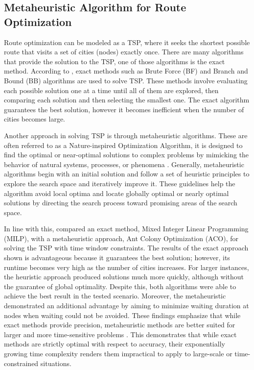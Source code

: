 \subsection{Metaheuristic Algorithm for Route Optimization}

Route optimization can be modeled as a TSP, where it seeks the shortest possible route that visits a set of cities (nodes) exactly once. There are many algorithms that provide the solution to the TSP, one of those algorithms is the exact method. According to \textcite{Violina2021}, exact methods such as Brute Force (BF) and Branch and Bound (BB) algorithms are used to solve TSP. These methods involve evaluating each possible solution one at a time until all of them are explored, then comparing each solution and then selecting the smallest one. The exact algorithm guarantees the best solution, however it becomes inefficient when the number of cities becomes large.

Another approach in solving TSP is through metaheuristic algorithms. These are often referred to as a Nature-inspired Optimization Algorithm, it is designed to find the optimal or near-optimal solutions to complex problems by mimicking the behavior of natural systems, processes, or phenomena \parencite{Sabery2023}. Generally, metaheuristic algorithms begin with an initial solution and follow a set of heuristic principles to explore the search space and iteratively improve it. These guidelines help the algorithm avoid local optima and locate globally optimal or nearly optimal solutions by directing the search process toward promising areas of the search space.

In line with this, \textcite{BarbCiorbea2023} compared an exact method, Mixed Integer Linear Programming (MILP), with a metaheuristic approach, Ant Colony Optimization (ACO), for solving the TSP with time window constraints. The results of the exact approach shown is advantageous because it guarantees the best solution; however, its runtime becomes very high as the number of cities increases. For larger instances, the heuristic approach produced solutions much more quickly, although without the guarantee of global optimality. Despite this, both algorithms were able to achieve the best result in the tested scenario. Moreover, the metaheuristic demonstrated an additional advantage by aiming to minimize waiting duration at nodes when waiting could not be avoided. These findings emphasize that while exact methods provide precision, metaheuristic methods are better suited for larger and more time-sensitive problems \parencite{BarbCiorbea2023}. This demonstrates that while exact methods are strictly optimal with respect to accuracy, their exponentially growing time complexity renders them impractical to apply to large-scale or time-constrained situations.

